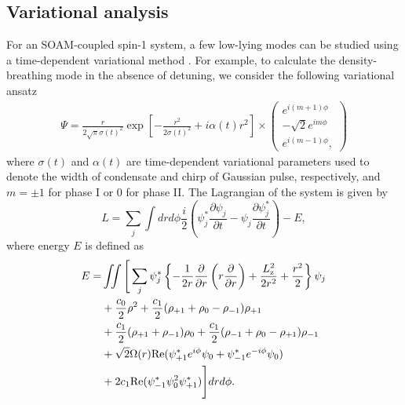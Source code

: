 \documentclass[pra,twocolumn,aps,superscriptaddress,showpacs,longbibliography]{revtex4-1}
\begin{document}
\subsection{Variational analysis}
For an SOAM-coupled spin-1 system, a few low-lying modes can be studied using a time-dependent variational method \cite{PhysRevLett.77.5320}. 
For example, to calculate the density-breathing mode in
the absence of detuning, we consider the following variational ansatz
\begin{multline}\label{var_ansatz}
\Psi =\frac{r}{2\sqrt{\pi}\sigma(t)^2} \exp\left[-\frac{r^2}{2 \sigma (t)^2}+i \alpha(t) r^2\right]\times
\begin{pmatrix}
  e^{i (m+1) \phi} \\
  -\sqrt{2} e^{im \phi}\\
 e^{i (m-1) \phi},
\end{pmatrix}
\end{multline}
where $\sigma(t)$ and $\alpha(t)$ are time-dependent variational parameters used to denote the width of condensate and chirp of Gaussian pulse, respectively,  and $m=\pm1$ for phase I or $0$ for phase II. 
The Lagrangian of the system is given by
\begin{equation}
\label{lagran}
 L = \sum_{j} \int dr d\phi \frac{i}{2}\left( \psi_j^*\frac{\partial \psi_j}{\partial t} -\psi_j\frac{\partial \psi_j^*}{\partial t}\right) -E,
\end{equation}
where energy $E$ is defined as 
\begin{align}
E=&\iint
\Bigg[\sum_j\psi_j^*\left\{-\frac{1}{2r}\frac{\partial}{\partial r}
 \left(r\frac{\partial}{\partial r}\right)+
\frac{L_{\rm z}^2}{2r^2}+
\frac{r^2}{2}\right\}\psi_j \nonumber\\ 
&+\frac{c_0}{2}\rho^2 + \frac{c_1}{2}(\rho_{+1} +\rho_0-
\rho_{-1})\rho_{+1}\nonumber\\&+ \frac{c_1}{2}(\rho_{+1} +\rho_{-1}) 
\rho_{0}\nonumber +   \frac{c_1}{2}(\rho_{-1} +\rho_0-
\rho_{+1})\rho_{-1}\nonumber\\&+ {\sqrt{2}}{\Omega(r)} {\rm Re}
(\psi_{+1}^*e^{i\phi}\psi_0 +\psi_{-1}^*e^{-i\phi}\psi_0 )
  \nonumber\\ 
& +2 c_1{\rm Re}(\psi_{-1}^*\psi_0^2\psi_{+1}^*)\Bigg] dr d\phi.
\end{align}
\end{document}
